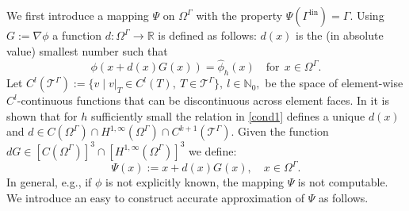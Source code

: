 \documentclass[final]{siamltex}
\begin{document}
We first introduce a mapping $\Psi$ on ${\Omega^{\Gamma}}$ with the property $\Psi({\Gamma^{\text{lin}}})=\Gamma$. Using $G:=\nabla \phi$ a function $d: {\Omega^{\Gamma}} \to \mathbb{R}$ is defined as follows: $d(x)$ is the (in absolute value) smallest number such that
\begin{equation} \label{cond1}
  \phi(x + d(x) G(x))=\hat \phi_h(x) \quad \text{for}~~x \in {\Omega^{\Gamma}}.
\end{equation}
Let $C^l({{\mathcal T}^{\Gamma}}) := \{ v \mid v|_T \in C^l(T),~ T \in {{\mathcal T}^{\Gamma}}\},~l \in \mathbb{N}_0,$ be the space of element-wise $C^l$-continuous functions that can be discontinuous across element faces.
In \cite{CLARH1} it is shown that for $h$ sufficiently small the relation in \eqref{cond1} defines a unique 
 $d(x)$ and $d \in C({\Omega^{\Gamma}}) \cap H^{1,\infty} ({\Omega^{\Gamma}}) \cap C^{k+1}({{\mathcal T}^{\Gamma}})$. Given the function
 $dG \in [C({\Omega^{\Gamma}})]^3 \cap [H^{1,\infty}({\Omega^{\Gamma}})]^3$ we define:
\begin{equation} \label{psi1}
 \Psi(x):= x + d(x) G(x), \quad x \in {\Omega^{\Gamma}}.
\end{equation}
In general, e.g., if $\phi$ is not explicitly known, the mapping $\Psi$ is not computable. We introduce an easy to construct accurate approximation of $\Psi$ as follows.
\end{document}
